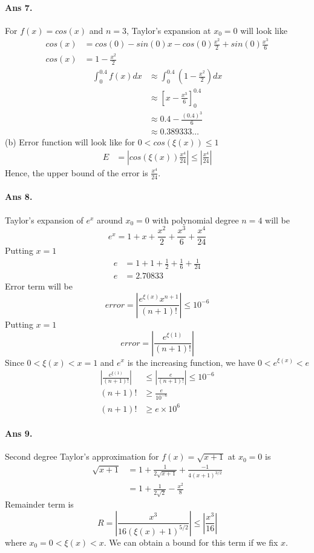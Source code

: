 \documentclass[12pt]{report}
\begin{document}
\paragraph*{Ans 7.} For $f(x) = cos(x)$ and $n = 3$, Taylor's expansion at $x_0 = 0$ will look like
\begin{align*}
    cos(x) &= cos(0) - sin(0)x - cos(0)\frac{x^2}{2} + sin(0)\frac{x^3}{6}\\
    cos(x) &= 1 - \frac{x^2}{2}
\end{align*}
\begin{align*}
    \int_{0}^{0.4} f(x)dx &\approx \int_{0}^{0.4}\left(1 - \frac{x^2}{2}\right) dx\\
    &\approx \left[x - \frac{x^3}{6}\right]_{0}^{0.4}\\
    & \approx 0.4 - \frac{(0.4)^3}{6}\\
    & \approx 0.389333 \dots
\end{align*}
(b) Error function will look like for $0 < cos(\xi(x)) \leq 1$
\begin{align*}
    E &= \left|cos(\xi(x))\frac{x^4}{24}\right| \leq \left|\frac{x^4}{24}\right|
\end{align*} 
Hence, the upper bound of the error is $\frac{x^4}{24}$.

\paragraph*{Ans 8.} Taylor's expansion of $e^x$ around $x_0 = 0$ with polynomial degree $n = 4$ will be
$$ e^x = 1 + x + \frac{x^2}{2} + \frac{x^3}{6} + \frac{x^4}{24} $$
Putting $x = 1$
\begin{align*}
    e &= 1 + 1 + \frac{1}{2} + \frac{1}{6} + \frac{1}{24} \\
    e &= 2.70833
\end{align*}
Error term will be
$$ error = \left|\frac{e^{\xi(x)} x^{n+1}}{(n+1)!}\right| \leq 10^{-6}$$
Putting $x = 1$
$$ error = \left|\frac{e^{\xi(1)}}{(n+1)!}\right| $$
Since $0< \xi(x) < x = 1$ and $e^x$ is the increasing function, we have $ 0 < e^{\xi(x)} < e$ 
\begin{align*}
    \left|\frac{e^{\xi(1)}}{(n+1)!}\right| &\leq \left| \frac{e}{(n+1)!}\right| \leq 10^{-6}\\
    (n+1)! &\geq \frac{e}{10^{-6}}\\
    (n+1)! &\geq e \times 10^6
\end{align*}
\paragraph*{Ans 9.} Second degree Taylor's approximation for $f(x) = \sqrt{x+1}$ at $x_0 = 0$ is 
\begin{align*}
    \sqrt{x+1} &= 1 + \frac{1}{2\sqrt{x+1}} + \frac{-1}{4(x+1)^{3/2}}\\
    &= 1 + \frac{1}{2\sqrt{2}} - \frac{x^2}{8}
\end{align*}
Remainder term is 
$$ R = \left|\frac{x^3}{16(\xi(x)+1)^{5/2}} \right|\leq \left|\frac{x^3}{16}\right|$$
where $x_0 = 0 < \xi(x) < x$.
We can obtain a bound for this term if we fix $x$.
\end{document}
